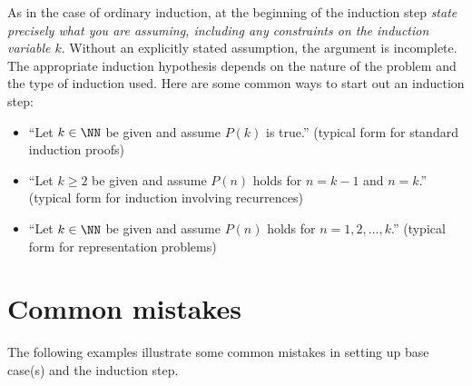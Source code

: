 \noindent
As in the case of ordinary induction, at the beginning of the 
induction step \emph{state precisely 
what you are assuming, including any constraints on the induction variable
$k$}.  Without an explicitly stated assumption, the argument is incomplete.  The
appropriate induction hypothesis depends on the nature of the problem and the
type of induction used.  Here are some common ways to start out an induction
step:
\begin{itemize}
\item ``Let $k\in \NN$ be given and assume $P(k)$ is true.''    
(typical form for standard induction proofs)
\item ``Let $k\ge 2$ be given and assume $P(n)$ holds for $n=k-1$ and $n=k$.''
(typical form for induction involving recurrences)
\item ``Let $k\in \NN$ be given and assume $P(n)$ holds for $n=1,2,\dots,k$.''
(typical form for representation problems)
\end{itemize}

\section{Common mistakes}
\label{sec:Induction:CommonMistakes}
 The following examples illustrate
some common mistakes in setting up base case(s) and the induction step.

